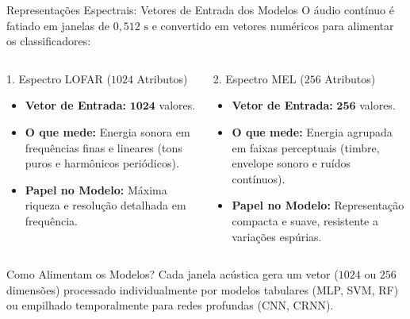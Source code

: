 \documentclass[aspectratio=169]{beamer}
\begin{document}
\begin{frame}{Representa\c{c}\~{o}es Espectrais: Vetores de Entrada dos Modelos}
    \small
    O \'{a}udio cont\'{i}nuo \'{e} fatiado em janelas de $0,512\text{ s}$ e convertido em vetores num\'{e}ricos para alimentar os classificadores:
    
    \vspace{0.1cm}
    \begin{columns}[t]
        \begin{block}{\small 1. Espectro LOFAR ($1024$ Atributos)}
            \footnotesize
            \begin{itemize}
                \setlength{\itemsep}{1pt}
                \item \textbf{Vetor de Entrada:} $\mathbf{1024}$ valores.
                \item \textbf{O que mede:} Energia sonora em frequ\^{e}ncias finas e lineares (tons puros e harm\^{o}nicos peri\'{o}dicos).
                \item \textbf{Papel no Modelo:} M\'{a}xima riqueza e resolu\c{c}\~{a}o detalhada em frequ\^{e}ncia.
            \end{itemize}
        \end{block}
        
        \begin{block}{\small 2. Espectro MEL ($256$ Atributos)}
            \footnotesize
            \begin{itemize}
                \setlength{\itemsep}{1pt}
                \item \textbf{Vetor de Entrada:} $\mathbf{256}$ valores.
                \item \textbf{O que mede:} Energia agrupada em faixas perceptuais (timbre, envelope sonoro e ru\'{i}dos cont\'{i}nuos).
                \item \textbf{Papel no Modelo:} Representa\c{c}\~{a}o compacta e suave, resistente a varia\c{c}\~{o}es esp\'{u}rias.
            \end{itemize}
        \end{block}
    \end{columns}
    
    \vspace{0.15cm}
    \begin{block}{\small Como Alimentam os Modelos?}
        \footnotesize
        Cada janela ac\'{u}stica gera um vetor ($1024$ ou $256$ dimens\~{o}es) processado individualmente por modelos tabulares (MLP, SVM, RF) ou empilhado temporalmente para redes profundas (CNN, CRNN).
    \end{block}
\end{frame}
\end{document}

